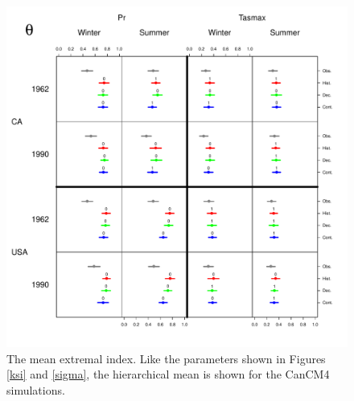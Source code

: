 \begin{figure}
\begin{center}
 \includegraphics[scale=0.72]{figs/theta.pdf}
\end{center}
\caption{The mean extremal index. Like the parameters shown in Figures \ref{ksi} and \ref{sigma}, the hierarchical mean is shown for the CanCM4 simulations.}
\label{theta}
\end{figure}

